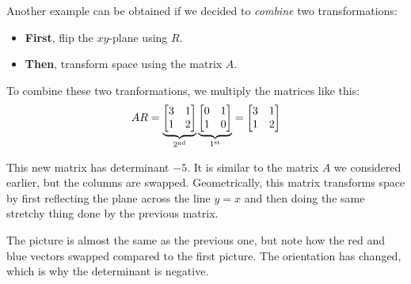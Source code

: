 \documentclass[10pt]{article}
\theoremstyle{definition}
\begin{document}
\begin{itemize}
  Another example can be obtained if we decided to \textit{combine} two
  transformations:
  \begin{itemize}
    \item \textbf{First}, flip the $xy$-plane using $R$.
    \item \textbf{Then}, transform space using the matrix $A$.
  \end{itemize}
  To combine these two tranformations, we multiply the matrices like this:
  \begin{equation*}
    AR =
    \underbrace{\begin{bmatrix}
      3&1\\
      1&2
    \end{bmatrix}}_{\tiny 2^{\rm nd}}
    \underbrace{\begin{bmatrix}
        0&1\\
        1&0
      \end{bmatrix}}_{\tiny 1^{\rm st}}
    =
    \begin{bmatrix}
      3&1\\
      1&2
    \end{bmatrix}
  \end{equation*}

  This new matrix has determinant $-5$. It is similar to the matrix $A$ we
  considered earlier, but the columns are swapped. Geometrically, this matrix
  transforms space by first reflecting the plane across the line $y=x$ and
  then doing the same stretchy thing done by the previous matrix.

  The picture is almost the same as the previous one, but note how the red and
  blue vectors swapped compared to the first picture. The orientation has
  changed, which is why the determinant is negative.
\end{itemize}
\end{document}
